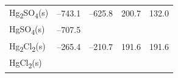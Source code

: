 \documentclass[
  9pt,
]{extbook}
\theoremstyle{definition}
\theoremstyle{definition}
\theoremstyle{definition}
\theoremstyle{remark}
\begin{document}
\begin{longtable}[]{@{}lllll@{}}
\begin{minipage}[t]{0.10\columnwidth}
Hg\textsubscript{2}SO\textsubscript{4}(s)\strut
\end{minipage} & \begin{minipage}[t]{0.19\columnwidth}\raggedright
--743.1\strut
\end{minipage} & \begin{minipage}[t]{0.20\columnwidth}\raggedright
--625.8\strut
\end{minipage} & \begin{minipage}[t]{0.18\columnwidth}\raggedright
200.7\strut
\end{minipage} & \begin{minipage}[t]{0.18\columnwidth}\raggedright
132.0\strut
\end{minipage}\tabularnewline
\begin{minipage}[t]{0.10\columnwidth}\raggedright
HgSO\textsubscript{4}(s)\strut
\end{minipage} & \begin{minipage}[t]{0.19\columnwidth}\raggedright
--707.5\strut
\end{minipage} & \begin{minipage}[t]{0.20\columnwidth}\raggedright
\strut
\end{minipage} & \begin{minipage}[t]{0.18\columnwidth}\raggedright
\strut
\end{minipage} & \begin{minipage}[t]{0.18\columnwidth}\raggedright
\strut
\end{minipage}\tabularnewline
\begin{minipage}[t]{0.10\columnwidth}\raggedright
Hg\textsubscript{2}Cl\textsubscript{2}(s)\strut
\end{minipage} & \begin{minipage}[t]{0.19\columnwidth}\raggedright
--265.4\strut
\end{minipage} & \begin{minipage}[t]{0.20\columnwidth}\raggedright
--210.7\strut
\end{minipage} & \begin{minipage}[t]{0.18\columnwidth}\raggedright
191.6\strut
\end{minipage} & \begin{minipage}[t]{0.18\columnwidth}\raggedright
191.6\strut
\end{minipage}\tabularnewline
\begin{minipage}[t]{0.10\columnwidth}\raggedright
HgCl\textsubscript{2}(s)\strut
\end{minipage} & \begin{minipage}[t]{0.19\columnwidth}\raggedright

\end{minipage}
\end{longtable}
\end{document}

